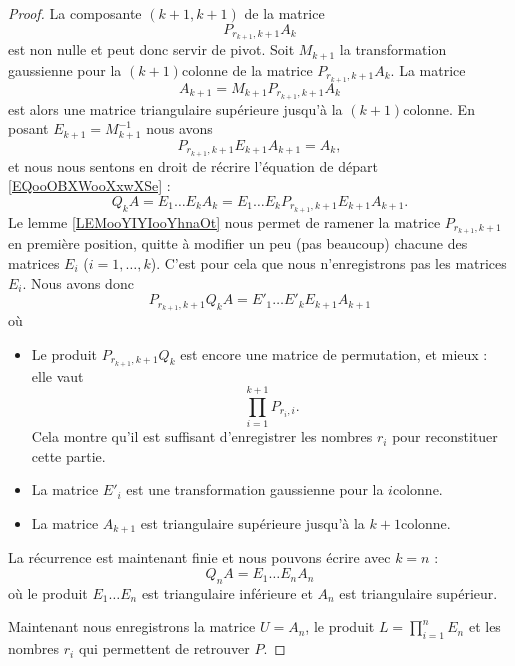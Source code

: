\begin{proof}
    La composante \( (k+1,k+1)\) de la matrice
    \begin{equation}
        P_{r_{k+1},k+1}A_k
    \end{equation}
    est non nulle et peut donc servir de pivot. Soit \( M_{k+1}\) la transformation gaussienne pour la \( (k+1)\)\ieme colonne de la matrice \( P_{r_{k+1},k+1}A_k\). La matrice
    \begin{equation}        \label{EQooCFIFooNDvPFE}
        A_{k+1}=M_{k+1}P_{r_{k+1},k+1}A_k
    \end{equation}
    est alors une matrice triangulaire supérieure jusqu'à la \( (k+1)\)\ieme colonne. En posant \( E_{k+1}=M_{k+1}^{-1}\) nous avons
    \begin{equation}
        P_{r_{k+1},k+1}E_{k+1}A_{k+1}=A_k,
    \end{equation}
    et nous nous sentons en droit de récrire l'équation de départ \eqref{EQooOBXWooXxwXSe} :
    \begin{equation}
        Q_kA=E_1\ldots E_kA_k=E_1\ldots E_kP_{r_{k+1},k+1}E_{k+1}A_{k+1}.
    \end{equation}
    Le lemme \ref{LEMooYIYIooYhnaOt} nous permet de ramener la matrice \( P_{r_{k+1},k+1}\) en première position, quitte à modifier un peu (pas beaucoup) chacune des matrices \( E_i\) (\( i=1,\ldots, k\)). C'est pour cela que nous n'enregistrons pas les matrices \( E_i\). Nous avons donc
    \begin{equation}
        P_{r_{k+1},k+1}Q_kA=E'_1\ldots E'_kE_{k+1}A_{k+1}
    \end{equation}
    où
    \begin{itemize}
        \item Le produit \( P_{r_{k+1},k+1}Q_k\) est encore une matrice de permutation, et mieux : elle vaut
            \begin{equation}
                \prod_{i=1}^{k+1}P_{r_i,i}.
            \end{equation}
            Cela montre qu'il est suffisant d'enregistrer les nombres \( r_i\) pour reconstituer cette partie.
        \item
            La matrice \( E'_i\) est une transformation gaussienne pour la \( i\)\ieme colonne.
        \item
            La matrice $A_{k+1}$ est triangulaire supérieure jusqu'à la \( k+1\)\ieme colonne.
    \end{itemize}
    
    La récurrence est maintenant finie et nous pouvons écrire avec \( k=n\) :
    \begin{equation}        \label{EQooFUEUooHVPFwn}
        Q_nA=E_1\ldots E_nA_n
    \end{equation}
    où le produit \( E_1\ldots E_n\) est triangulaire inférieure et \( A_n\) est triangulaire supérieur.

    Maintenant nous enregistrons la matrice \( U=A_n\), le produit \( L=\prod_{i=1}^nE_n\) et les nombres \( r_i\) qui permettent de retrouver \( P\).
\end{proof}

